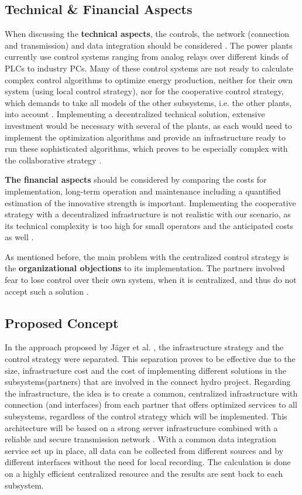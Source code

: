 \subsection{Technical \& Financial Aspects}
When discussing the \textbf{technical aspects}, the controls, the network (connection and transmission) and data integration should be considered \cite{SEIT2017}. The power plants currently use control systems ranging from analog relays over different kinds of PLCs to industry PCs. Many of these control systems are not ready to calculate complex control algorithms to optimize energy production, neither for their own system (using local control strategy), nor for the cooperative control strategy, which demands to take all models of the other subsystems, i.e. the other plants, into account \cite{SEIT2017}. Implementing a decentralized technical solution, extensive investment would be necessary with several of the plants, as each would need to implement the optimization algorithms and provide an infrastructure ready to run these sophisticated algorithms, which proves to be especially complex with the collaborative strategy \cite{SEIT2017}.

\textbf{The financial aspects} should be considered by comparing the costs for implementation, long-term operation and maintenance including a quantified estimation of the innovative strength is important. Implementing the cooperative strategy with a decentralized infrastructure is not realistic with our scenario, as its technical complexity is too high for small operators and the anticipated costs as well \cite{SEIT2017}.

As mentioned before, the main problem with the centralized control strategy is the \textbf{organizational objections} to its implementation. The partners involved fear to lose control over their own system, when it is centralized, and thus do not accept such a solution \cite{stewart2010cooperative}.
\subsection{Proposed Concept}
In the approach proposed by Jäger et al. \cite{SEIT2017}, the infrastructure strategy and the control strategy were separated. This separation proves to be effective due to the size, infrastructure cost and the cost of implementing different solutions in the subsystems(partners) that are involved in the connect hydro project. Regarding the infrastructure, the idea is to create a common, centralized infrastructure with connection (and interfaces) from each
partner that offers optimized services to all subsystems, regardless of the control strategy which will be implemented. This architecture will be based on a strong server infrastructure combined with a reliable and secure transmission network \cite{SEIT2017}. With a common data integration service set up in place, all data can be collected from different sources and by different interfaces without the need for local recording. The calculation is done on a highly efficient centralized resource and the results are sent back to each subsystem.

